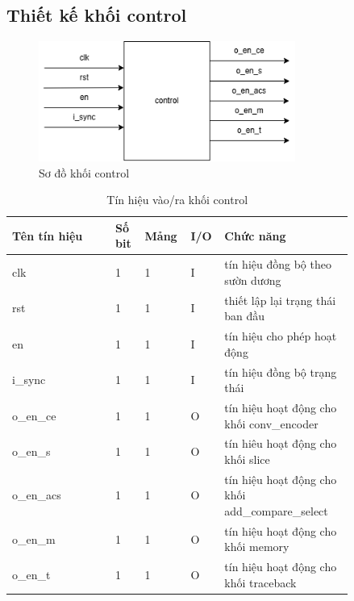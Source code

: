 \documentclass[../DoAn.tex]{subfiles}
\begin{document}
\subsection{Thiết kế khối control}

\begin{figure}[H]
    \centering
    \includegraphics[width=0.75\textwidth, height=0.13\textheight, keepaspectratio]{Hinhve/Chuong 4/control.png}
    \caption{Sơ đồ khối control}
\end{figure}

\begin{table}[H]
\centering{}
    \caption{Tín hiệu vào/ra khối control}
    \begin{tabular}{|p{0.28\linewidth}|p{0.08\linewidth}|p{0.08\linewidth}|p{0.05\linewidth}|p{0.35\linewidth}|}
        \hline
        \textbf{Tên tín hiệu} & \textbf{Số bit}  & \textbf{Mảng}     & \textbf{I/O}   & \textbf{Chức năng} \\ \hline\hline
        clk  & 1   & 1     & I     & tín hiệu đồng bộ theo sườn dương \\ \hline
        rst   & 1   & 1     & I     & thiết lập lại trạng thái ban đầu\\ \hline
        en        & 1   & 1     & I     & tín hiệu cho phép hoạt động \\ \hline
        i\_sync  & 1   & 1     & I     & tín hiệu đồng bộ trạng thái \\ \hline
        o\_en\_ce  & 1   & 1     & O     & tín hiệu hoạt động cho khối conv\_encoder \\ \hline
        o\_en\_s  & 1   & 1     & O     & tín hiêu hoạt động cho khối slice \\ \hline
        o\_en\_acs  & 1   & 1     & O     & tín hiệu hoạt động cho khối add\_compare\_select \\ \hline
        o\_en\_m  & 1   & 1     & O     & tín hiệu hoạt động cho khối memory \\ \hline
        o\_en\_t  & 1   & 1     & O     & tín hiệu hoạt động cho khối traceback \\ \hline
        \end{tabular}
\end{table}
\end{document}
